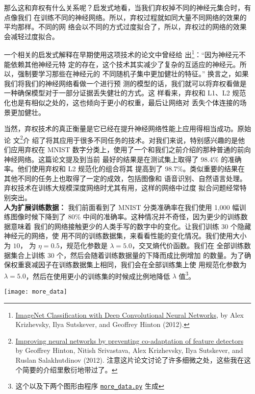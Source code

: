 那么这和弃权有什么关系呢？启发式地看，当我们弃权掉不同的神经元集合时，有点像我们
在训练不同的神经网络。所以，弃权过程就如同大量不同网络的效果的平均那样。不同的网
络会以不同的方式过度拟合了，所以，弃权过的网络的效果会减轻过度拟合。

一个相关的启发式解释在早期使用这项技术的论文中曾经给
出\footnote{\href{https://papers.nips.cc/paper/4824-imagenet-classification-with-deep-convolutional-neural-networks.pdf}{ImageNet
    Classification with Deep Convolutional Neural Networks}, by Alex Krizhevsky,
  Ilya Sutskever, and Geoffrey Hinton (2012).}：“因为神经元不能依赖其他神经元特
定的存在，这个技术其实减少了复杂的互适应的神经元。所以，强制要学习那些在神经元的
不同随机子集中更加健壮的特征。” 换言之，如果我们将我们的神经网络看做一个进行预
测的模型的话，我们就可以将弃权看做是一种确保模型对于一部分证据丢失健壮的方式。这
样看来，弃权和 L1、L2 规范化也是有相似之处的，这也倾向于更小的权重，最后让网络对
丢失个体连接的场景更加健壮。

当然，弃权技术的真正衡量是它已经在提升神经网络性能上应用得相当成功。原始论
文\footnote{\href{http://arxiv.org/pdf/1207.0580.pdf}{Improving neural networks
    by preventing co-adaptation of feature detectors} by Geoffrey Hinton, Nitish
  Srivastava, Alex Krizhevsky, Ilya Sutskever, and Ruslan Salakhutdinov
  (2012). 注意这片论文讨论了许多细微之处，这些我在这个简要的介绍里敷衍地带过了。}介
绍了将其应用于很多不同任务的技术。对我们来说，特别感兴趣的是他们应用弃权在 MNIST
数字分类上，使用了一个和我们之前介绍的那种普通的前向神经网络。这篇论文提及到当前
最好的结果是在测试集上取得了 98.4\% 的准确率。他们使用弃权和 L2 规范化的组合将其
提高到了 98.7\%。类似重要的结果在其他不同的任务上也取得了一定的成效，包括图像和
语音识别、自然语言处理。弃权技术在训练大规模深度网络时尤其有用，这样的网络中过度
拟合问题经常特别突出。\\

\textbf{人为扩展训练数据：} 我们前面看到了 MNIST 分类准确率在我们使用 1,000 幅训
练图像时候下降到了 80\% 中间的准确率。这种情况并不奇怪，因为更少的训练数据意味着
我们的网络接触更少的人类手写的数字中的变化。让我们训练 30 个隐藏神经元的网络，使
用不同的训练数据集，来看看性能的变化情况。我们使用\minibatch{}大小为 $10$，
\learningrate{}为 $\eta=0.5$，规范化参数是 $\lambda=5.0$，交叉熵代价函数。我们在
全部训练数据集合上训练 30 个\epochs{}，然后会随着训练数据量的下降而成比例增加
\epochs{}的数量。为了确保权重衰减因子在训练数据集上相同，我们会在全部训练集上使
用规范化参数为 $\lambda = 5.0$，然后在使用更小的训练集的时候成比例地降低
$\lambda$ 值\footnote{这个以及下两个图形由程序
  \href{https://github.com/mnielsen/neural-networks-and-deep-learning/blob/master/fig/more_data.py}{\lstinline!more_data.py!}
  生成}。
\begin{center}
\texttt{[image: more\_data]}
\end{center}


